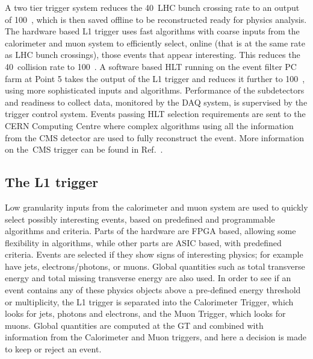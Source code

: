 A two tier trigger system reduces the 40~\MHz \ac{LHC} bunch crossing rate to an output of 100~\Hz, which is then saved offline to be reconstructed ready for physics analysis. 
The hardware based \ac{L1} trigger uses fast algorithms with coarse inputs from the calorimeter and muon system to efficiently select, online (that is at the same rate as \ac{LHC} bunch crossings),
 those events that appear interesting. 
 This reduces the 40~\MHz collision rate to 100~\kHz.
A software based \ac{HLT} running on the event filter PC farm at Point 5 takes the output of the \ac{L1} trigger and reduces it further to 100~\Hz, using more sophisticated inputs and algorithms.
Performance of the subdetectors and readiness to collect data, monitored by the \ac{DAQ} system, is supervised by the trigger control system.
Events passing \ac{HLT} selection requirements are sent to the \ac{CERN} Computing Centre where complex algorithms using all the information from the \ac{CMS} detector are used to fully reconstruct the event.
More information on the~\ac{CMS} trigger can be found in Ref.~\cite{Cittolin:578006}.

\subsection{The L1 trigger}
Low granularity inputs from the calorimeter and muon system are used to quickly select possibly interesting events, based on predefined and programmable algorithms and criteria.
Parts of the hardware are \ac{FPGA} based, allowing some flexibility in algorithms, while other parts are \ac{ASIC} based, with predefined criteria.
Events are selected if they show signs of interesting physics; for example have jets, electrons/photons, or muons. 
Global quantities such as total transverse energy and total missing transverse energy are also used.  
In order to see if an event contains any of these physics objects above a pre-defined energy threshold or multiplicity, 
the \ac{L1} trigger is separated into the Calorimeter Trigger, which looks for jets, photons and electrons, and the Muon Trigger, which looks for muons. 
Global quantities are computed at the \ac{GT} and combined with information from the Calorimeter and Muon triggers, 
and here a decision is made to keep or reject an event.

